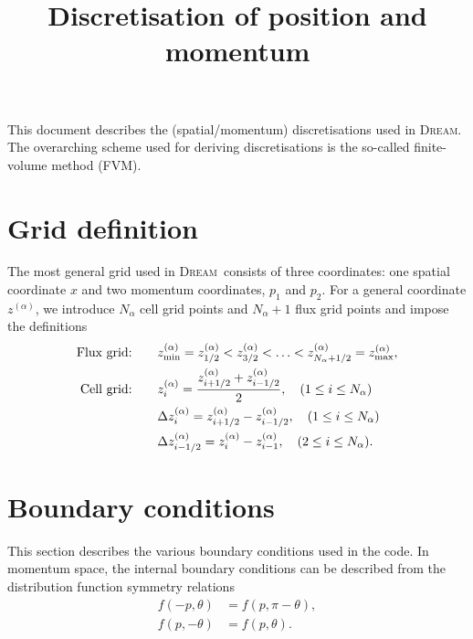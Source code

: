 \documentclass{notes}
\title{Discretisation of position and momentum}
\author{}
\newcommand{\DREAM}{\textsc{Dream}}
\begin{document}
    \maketitle

    \noindent
    This document describes the (spatial/momentum) discretisations used in \DREAM.
    The overarching scheme used for deriving discretisations is the so-called
    finite-volume method (FVM).

    \tableofcontents

    \section{Grid definition}
    The most general grid used in \DREAM\ consists of three coordinates: one
    spatial coordinate $x$ and two momentum coordinates, $p_1$ and $p_2$. For
    a general coordinate $z^{(\alpha)}$, we introduce $N_\alpha$ cell grid points and
    $N_\alpha+1$ flux grid points and impose the definitions
    \begin{equation}
        \begin{aligned}
            \text{Flux grid:} & \qquad z^{(\alpha)}_{\rm min} = z^{(\alpha)}_{1/2} < z^{(\alpha)}_{3/2} < \ldots < z^{(\alpha)}_{N_\alpha+1/2} = z^{(\alpha)}_{\rm max},\\
            \text{Cell grid:} & \qquad z^{(\alpha)}_i = \frac{z^{(\alpha)}_{i+1/2} + z^{(\alpha)}_{i-1/2}}{2}, \quad (1\leq i \leq N_\alpha)\\
            &\qquad \Delta z^{(\alpha)}_i = z^{(\alpha)}_{i+1/2} - z^{(\alpha)}_{i-1/2}, \quad (1\leq i \leq N_\alpha)\\
            &\qquad \Delta z^{(\alpha)}_{i-1/2} = z^{(\alpha)}_i - z^{(\alpha)}_{i-1},\quad (2\leq i \leq N_\alpha).
        \end{aligned}
    \end{equation}

    \section{Boundary conditions}
    This section describes the various boundary conditions used in the code.
    In momentum space, the internal boundary conditions can be described from
    the distribution function symmetry relations
    \begin{equation}\label{eq:fsymmetry}
        \begin{aligned}
            f(-p,\theta) &= f(p,\pi-\theta),\\
            f(p,-\theta) &= f(p,\theta).
        \end{aligned}
    \end{equation}
\end{document}
